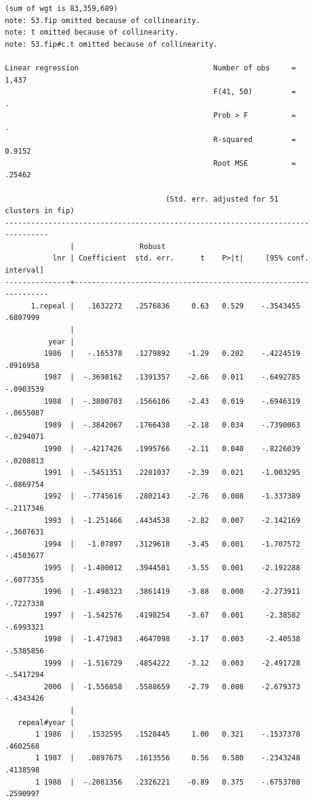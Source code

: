 \documentclass[
]{book}
\begin{document}
\begin{verbatim}
(sum of wgt is 83,359,689)
note: 53.fip omitted because of collinearity.
note: t omitted because of collinearity.
note: 53.fip#c.t omitted because of collinearity.

Linear regression                               Number of obs     =      1,437
                                                F(41, 50)         =          .
                                                Prob > F          =          .
                                                R-squared         =     0.9152
                                                Root MSE          =     .25462

                                     (Std. err. adjusted for 51 clusters in fip)
--------------------------------------------------------------------------------
               |               Robust
           lnr | Coefficient  std. err.      t    P>|t|     [95% conf. interval]
---------------+----------------------------------------------------------------
      1.repeal |   .1632272   .2576836     0.63   0.529    -.3543455    .6807999
               |
          year |
         1986  |   -.165378   .1279892    -1.29   0.202    -.4224519    .0916958
         1987  |  -.3698162   .1391357    -2.66   0.011    -.6492785   -.0903539
         1988  |  -.3800703   .1566106    -2.43   0.019    -.6946319   -.0655087
         1989  |  -.3842067   .1766438    -2.18   0.034    -.7390063   -.0294071
         1990  |  -.4217426   .1995766    -2.11   0.040    -.8226039   -.0208813
         1991  |  -.5451351   .2281037    -2.39   0.021    -1.003295   -.0869754
         1992  |  -.7745616   .2802143    -2.76   0.008    -1.337389   -.2117346
         1993  |  -1.251466   .4434538    -2.82   0.007    -2.142169   -.3607631
         1994  |   -1.07897   .3129618    -3.45   0.001    -1.707572   -.4503677
         1995  |  -1.400012   .3944501    -3.55   0.001    -2.192288   -.6077355
         1996  |  -1.498323   .3861419    -3.88   0.000    -2.273911   -.7227338
         1997  |  -1.542576   .4198254    -3.67   0.001     -2.38582   -.6993321
         1998  |  -1.471983   .4647098    -3.17   0.003     -2.40538   -.5385856
         1999  |  -1.516729   .4854222    -3.12   0.003    -2.491728   -.5417294
         2000  |  -1.556858   .5588659    -2.79   0.008    -2.679373   -.4343426
               |
   repeal#year |
       1 1986  |   .1532595   .1528445     1.00   0.321    -.1537378    .4602568
       1 1987  |   .0897675   .1613556     0.56   0.580    -.2343248    .4138598
       1 1988  |  -.2081356   .2326221    -0.89   0.375    -.6753708    .2590997

\end{verbatim}
\end{document}
